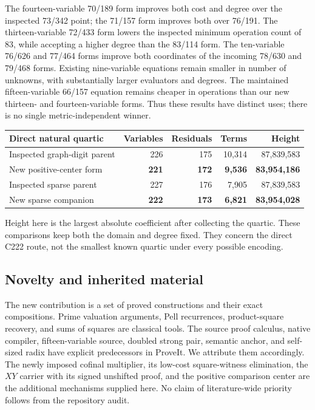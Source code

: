 \documentclass[11pt,letterpaper]{article}
\theoremstyle{remark}\newtheorem{remark}[theorem]{Remark}
\begin{document}
The fourteen-variable 70/189 form improves both cost and degree over the
inspected 73/342 point; the 71/157 form improves both over 76/191. The
thirteen-variable 72/433 form lowers the inspected minimum operation count of
83, while accepting a higher degree than the 83/114 form. The ten-variable
76/626 and 77/464 forms improve both coordinates of the incoming 78/630 and
79/468 forms. Existing nine-variable equations remain smaller in number of
unknowns, with substantially larger evaluators and degrees. The maintained
fifteen-variable 66/157 equation remains cheaper in operations than our new
thirteen- and fourteen-variable forms. Thus these results have distinct uses;
there is no single metric-independent winner.

\begin{center}\small
\begin{tabular}{@{}lrrrr@{}}
\toprule
Direct natural quartic & Variables & Residuals & Terms & Height\\
\midrule
Inspected graph-digit parent & 226 & 175 & 10,314 & 87,839,583\\
New positive-center form & \textbf{221} & \textbf{172} & \textbf{9,536} & \textbf{83,954,186}\\
Inspected sparse parent & 227 & 176 & 7,905 & 87,839,583\\
New sparse companion & \textbf{222} & \textbf{173} & \textbf{6,821} & \textbf{83,954,028}\\
\bottomrule
\end{tabular}
\end{center}
Height here is the largest absolute coefficient after collecting the quartic.
These comparisons keep both the domain and degree fixed. They concern the
direct C222 route, not the smallest known quartic under every possible encoding.

\subsection{Novelty and inherited material}

The new contribution is a set of proved constructions and their exact
compositions. Prime valuation arguments, Pell recurrences, product-square
recovery, and sums of squares are classical tools. The source proof calculus,
native compiler, fifteen-variable source, doubled strong pair, semantic anchor,
and self-sized radix have explicit predecessors in ProveIt. We attribute them
accordingly. The newly imposed cofinal multiplier, its low-cost square-witness
elimination, the $XY$ carrier with its signed unshifted proof, and the positive
comparison center are the additional mechanisms supplied here. No claim of
literature-wide priority follows from the repository audit.
\end{document}
